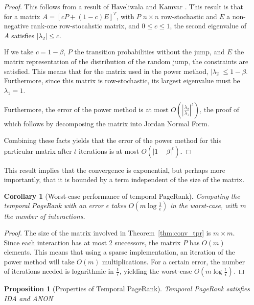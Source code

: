 \documentclass[a4paper,11pt]{book}
\newcommand{\eps}{\epsilon}
\newtheorem{proposition}{Proposition}
\newtheorem*{corollary}{Corollary}
\theoremstyle{definition}
\begin{document}
\begin{proof}
    This follows from a result of Haveliwala and Kamvar \cite{haveliwala2003second}. This
    result is that for a matrix $A = [cP + (1-c)E]^T$, with $P$ $n \times n$ row-stochastic
    and $E$ a non-negative rank-one row-stocahstic matrix, and $0 \leq c \leq 1$, the
    second eigenvalue of $A$ satisfies $|\lambda_2| \leq c$. 

    If we take $c=1-\beta$, $P$ the transition probabilities without the jump, and $E$ the
    matrix representation of the distribution of the random jump, the constraints are satisfied.
    This means that for the matrix used in the power method, $|\lambda_2| \leq 1-\beta$.
    Furthermore, since this matrix is row-stochastic, its largest eigenvalue must be $\lambda_1=1$.

    Furthermore, the error of the power method is at most $O\left(\left|\frac{\lambda_2}{\lambda_1}\right|^t\right)$,
    the proof of which follows by decomposing the matrix into Jordan Normal Form.

    Combining these facts yields that the error of the power method for this particular matrix
    after $t$ iterations is at most $O(|1-\beta|^t)$. 
\end{proof}

This result implies that the convergence is exponential, but perhaps more importantly, that it is bounded
by a term independent of the size of the matrix. 

\begin{corollary}[Worst-case performance of temporal PageRank]
    Computing the temporal PageRank with an error $\eps$ takes $O(m\log\frac1\eps)$ in the worst-case,
    with $m$ the number of interactions.
\end{corollary}
\begin{proof}
    The size of the matrix involved in Theorem~\ref{thm:conv_tpr} is $m \times m$. Since each interaction
    has at most 2 successors, the matrix $P$ has $O(m)$ elements. This means that using a sparse implementation,
    an iteration of the power method will take $O(m)$ multiplications. For a certain error, the number of
    iterations needed is logarithmic in $\frac1\eps$, yielding the worst-case $O(m\log\frac1\eps)$.
\end{proof}

\begin{proposition}[Properties of Temporal PageRank]
    Temporal PageRank satisfies IDA and ANON  
    \label{prop:prop_temp_pr}
\end{proposition}
\end{document}
